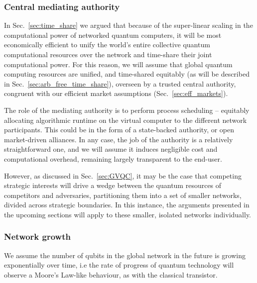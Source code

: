 %
%

\subsubsection{Central mediating authority}

In Sec.~\ref{sec:time_share} we argued that because of the super-linear scaling in the computational power of networked quantum computers, it will be most economically efficient to unify the world's entire collective quantum computational resources over the network and time-share their joint computational power. For this reason, we will assume that global quantum computing resources are unified, and time-shared equitably (as will be described in Sec.~\ref{sec:arb_free_time_share}), overseen by a trusted central authority, congruent with our efficient market assumptions (Sec.~\ref{sec:eff_markets}).

The role of the mediating authority is to perform process scheduling -- equitably allocating algorithmic runtime on the virtual computer to the different network participants. This could be in the form of a state-backed authority, or open market-driven alliances. In any case, the job of the authority is a relatively straightforward one, and we will assume it induces negligible cost and computational overhead, remaining largely transparent to the end-user.

However, as discussed in Sec.~\ref{sec:GVQC}, it may be the case that competing strategic interests will drive a wedge between the quantum resources of competitors and adversaries, partitioning them into a set of smaller networks, divided across strategic boundaries. In this instance, the arguments presented in the upcoming sections will apply to these smaller, isolated networks individually.

%
%

\subsubsection{Network growth} 

We assume the number of qubits in the global network in the future is growing exponentially over time, i.e the rate of progress of quantum technology will observe a Moore's Law-like behaviour, as with the classical transistor.

